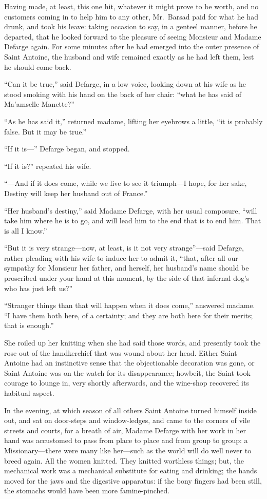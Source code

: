 Having made, at least, this one hit, whatever it might prove to be worth,
and no customers coming in to help him to any other, Mr.\ Barsad paid
for what he had drunk, and took his leave:  taking occasion to say, in a
genteel manner, before he departed, that he looked forward to the pleasure
of seeing Monsieur and Madame Defarge again.  For some minutes after he
had emerged into the outer presence of Saint Antoine, the husband and
wife remained exactly as he had left them, lest he should come back.

``Can it be true,'' said Defarge, in a low voice, looking down at his
wife as he stood smoking with his hand on the back of her chair:  ``what
he has said of Ma'amselle Manette?''

``As he has said it,'' returned madame, lifting her eyebrows a little,
``it is probably false.  But it may be true.''

``If it is---'' Defarge began, and stopped.

``If it is?'' repeated his wife.

``---And if it does come, while we live to see it triumph---I hope, for
her sake, Destiny will keep her husband out of France.''

``Her husband's destiny,'' said Madame Defarge, with her usual composure,
``will take him where he is to go, and will lead him to the end that is
to end him.  That is all I know.''

``But it is very strange---now, at least, is it not very strange''---said
Defarge, rather pleading with his wife to induce her to admit it,
``that, after all our sympathy for Monsieur her father, and herself,
her husband's name should be proscribed under your hand at this moment,
by the side of that infernal dog's who has just left us?''

``Stranger things than that will happen when it does come,'' answered
madame.  ``I have them both here, of a certainty; and they are both
here for their merits; that is enough.''

She roiled up her knitting when she had said those words, and presently
took the rose out of the handkerchief that was wound about her head.
Either Saint Antoine had an instinctive sense that the objectionable
decoration was gone, or Saint Antoine was on the watch for its
disappearance; howbeit, the Saint took courage to lounge in, very
shortly afterwards, and the wine-shop recovered its habitual aspect.

In the evening, at which season of all others Saint Antoine turned
himself inside out, and sat on door-steps and window-ledges, and
came to the corners of vile streets and courts, for a breath of air,
Madame Defarge with her work in her hand was accustomed to pass from
place to place and from group to group:  a Missionary---there were
many like her---such as the world will do well never to breed again.
All the women knitted.  They knitted worthless things; but, the
mechanical work was a mechanical substitute for eating and drinking;
the hands moved for the jaws and the digestive apparatus:  if the bony
fingers had been still, the stomachs would have been more famine-pinched.

